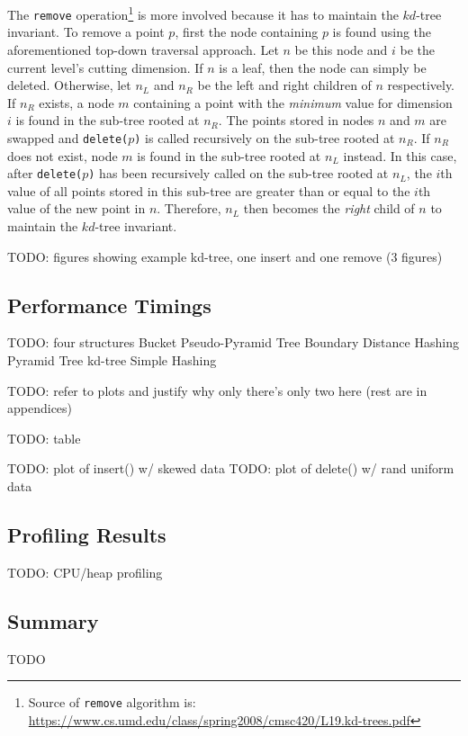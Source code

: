 The \texttt{remove} operation\footnote{Source of \texttt{remove} algorithm is: \url{https://www.cs.umd.edu/class/spring2008/cmsc420/L19.kd-trees.pdf‎}} is more involved because it has to maintain the $kd$-tree invariant. To remove a point $p$, first the node containing $p$ is found using the aforementioned top-down traversal approach. Let $n$ be this node and $i$ be the current level's cutting dimension. If $n$ is a leaf, then the node can simply be deleted. Otherwise, let $n_L$ and $n_R$ be the left and right children of $n$ respectively. If $n_R$ exists, a node $m$ containing a point with the \textit{minimum} value for dimension $i$ is found in the sub-tree rooted at $n_R$. The points stored in nodes $n$ and $m$ are swapped and \texttt{delete($p$)} is called recursively on the sub-tree rooted at $n_R$. If $n_R$ does not exist, node $m$ is found in the sub-tree rooted at $n_L$ instead. In this case, after \texttt{delete($p$)} has been recursively called on the sub-tree rooted at $n_L$, the $i$th value of all points stored in this sub-tree are greater than or equal to the $i$th value of the new point in $n$. Therefore, $n_L$ then becomes the \textit{right} child of $n$ to maintain the $kd$-tree invariant.

TODO: figures showing example kd-tree, one insert and one remove (3 figures)

\subsection{Performance Timings}

TODO: four structures
	Bucket Pseudo-Pyramid Tree
	Boundary Distance Hashing
	Pyramid Tree
	kd-tree
	Simple Hashing

TODO: refer to plots and justify why only there's only two here (rest are in appendices)

TODO: table

TODO: plot of insert() w/ skewed data
TODO: plot of delete() w/ rand uniform data

\subsection{Profiling Results}

TODO: CPU/heap profiling

\subsection{Summary}

TODO
